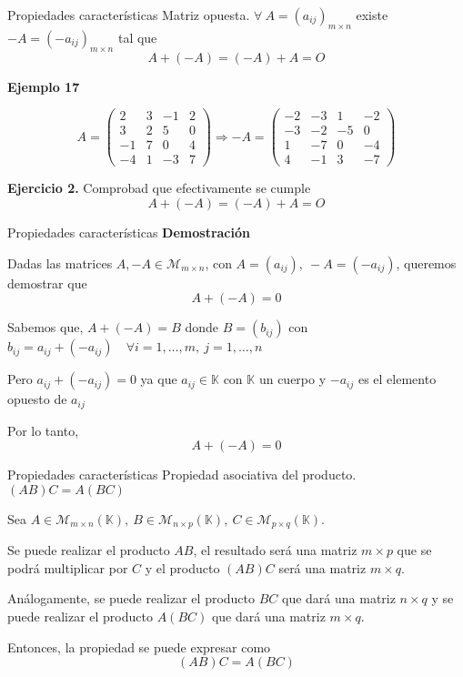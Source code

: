 \documentclass[
  ignorenonframetext,
]{beamer}
\begin{document}
\begin{frame}{Propiedades características}
\protect\hypertarget{propiedades-caracteruxedsticas-6}{}
Matriz opuesta. \(\forall\ A=(a_{ij})_{m\times n}\) existe
\(-A = (-a_{ij})_{m\times n}\) tal que \[A+(-A)=(-A)+A=O\]

\textbf{Ejemplo 17}

\[A = \begin{pmatrix}2&3&-1&2\\3&2&5&0\\-1&7&0&4\\-4&1&-3&7\end{pmatrix}\Rightarrow -A = \begin{pmatrix}-2&-3&1&-2\\-3&-2&-5&0\\1&-7&0&-4\\4&-1&3&-7\end{pmatrix}\]

\textbf{Ejercicio 2.} Comprobad que efectivamente se cumple
\[A+(-A)=(-A)+A = O\]
\end{frame}

\begin{frame}{Propiedades características}
\protect\hypertarget{propiedades-caracteruxedsticas-7}{}
\textbf{Demostración}

Dadas las matrices \(A,-A\in\mathcal{M}_{m\times n}\), con
\(A = (a_{ij}),\ -A = (-a_{ij})\), queremos demostrar que \[A+(-A) = 0\]

Sabemos que, \(A+(-A) = B\) donde \(B = (b_{ij})\) con
\(b_{ij} = a_{ij}+(-a_{ij})\quad\forall i=1,\dots,m,\ j=1,\dots,n\)

Pero \(a_{ij} + (-a_{ij}) = 0\) ya que \(a_{ij}\in\mathbb{K}\) con
\(\mathbb{K}\) un cuerpo y \(-a_{ij}\) es el elemento opuesto de
\(a_{ij}\)

Por lo tanto, \[ A+(-A)= 0 \]
\end{frame}

\begin{frame}{Propiedades características}
\protect\hypertarget{propiedades-caracteruxedsticas-8}{}
Propiedad asociativa del producto. \((AB)C=A(BC)\)

Sea
\(A\in\mathcal{M}_{m\times n}(\mathbb{K}),\ B\in\mathcal{M}_{n\times p}(\mathbb{K}),\ C\in\mathcal{M}_{p\times q}(\mathbb{K})\).

Se puede realizar el producto \(AB\), el resultado será una matriz
\(m\times p\) que se podrá multiplicar por \(C\) y el producto \((AB)C\)
será una matriz \(m\times q\).

Análogamente, se puede realizar el producto \(BC\) que dará una matriz
\(n\times q\) y se puede realizar el producto \(A(BC)\) que dará una
matriz \(m\times q\).

Entonces, la propiedad se puede expresar como \[(AB)C=A(BC)\]
\end{frame}
\end{document}
